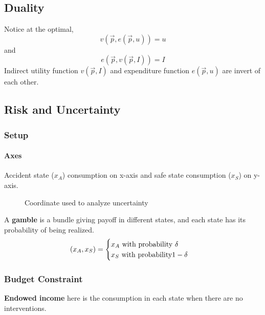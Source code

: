 \documentclass[]{article}
\begin{document}
        \subsection{Duality}
            \begin{remark}
                Notice at the optimal, 
                \[
                    v(\vec{p}, e(\vec{p}, u)) = u
                \]
                and
                \[
                    e(\vec{p}, v(\vec{p}, I)) = I
                \]
                Indirect utility function $v(\vec{p}, I)$ and expenditure function $e(\vec{p}, u)$ are invert of each other.
            \end{remark}
    
        \subsection{Risk and Uncertainty}
            \subsubsection{Setup}
                \paragraph{Axes} Accident state ($x_A$) consumption on x-axis and safe state consumption ($x_S$) on y-axis.
                
                \begin{figure}[h]
                    \centering
                    \caption{Coordinate used to analyze uncertainty}
                \end{figure}
                
                \begin{definition}
                    A \textbf{gamble} is a bundle giving payoff in different states, and each state has its probability of being realized.
                    \[
                        (x_A, x_S) =
                        \begin{cases}
                            x_A \text{{ with probability }} \delta \\
                            x_S \text{{ with probability}} 1 - \delta \\
                        \end{cases}
                    \]
                \end{definition}
            
            \subsubsection{Budget Constraint}
                \begin{remark} 
                    \textbf{Endowed income} here is the consumption in each state when there are no interventions.
                \end{remark}
                
\end{document}
